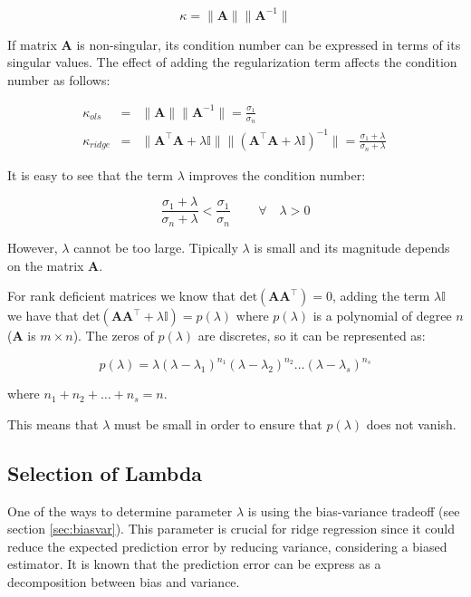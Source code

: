 \begin{equation*}
	\kappa = \|\mathbf{A}\| \|\mathbf{A}^{-1}\|
\end{equation*}

If matrix $\mathbf{A}$ is non-singular, its condition number can be
expressed in terms of its singular values. The effect of adding the
regularization term affects the condition number as follows:

\begin{eqnarray*}
\kappa_{ols} &=& \|\mathbf{A}\| \|\mathbf{A}^{-1}\|=\frac{\sigma_1}{\sigma_n} \\
\kappa_{ridge} &=& \|\mathbf{A}^\intercal \mathbf{A} + \lambda \mathbb{I}\| 
\|(\mathbf{A}^\intercal \mathbf{A} + \lambda \mathbb{I})^{-1}\|=\frac{\sigma_1+\lambda}{\sigma_n + \lambda} \,
\end{eqnarray*}

It is easy to see that the term $\lambda$ improves the condition number: 

\begin{equation*}
        \frac{\sigma_1+\lambda}{\sigma_n + \lambda} <
        \frac{\sigma_1}{\sigma_n} \,  \qquad \forall \quad \lambda > 0
\end{equation*}


However, $\lambda$ cannot be too large. Tipically $\lambda$ is small and its
magnitude depends on the matrix $\mathbf{A}$.

For rank deficient matrices we know that $\text{det}(\mathbf{A A^\top})=0$, adding the
term $\lambda \mathbb{I}$ we have that $\text{det}(\mathbf{A A^\top}+\lambda \mathbb{I}) =
p(\lambda)$ where $p(\lambda)$ is a polynomial of degree $n$ ($\mathbf{A}$ is
$m \times n$). The zeros of $p(\lambda)$ are discretes, so it can be represented
as:

\[
p(\lambda) =
\lambda(\lambda-\lambda_1)^{n_1}(\lambda-\lambda_2)^{n_2}\dots(\lambda-\lambda_s)^{n_s}
\]

\noindent where $n_1 + n_2 + \dots + n_s = n$.

This means that $\lambda$ must be small in order to ensure that $p(\lambda)$
does not vanish.


\subsection{Selection of Lambda}

One of the ways to determine parameter $\lambda$ is using the bias-variance tradeoff (see section \ref{sec:biasvar}). This parameter is crucial for ridge regression since it could
reduce the expected prediction error by reducing variance, considering a biased
estimator. 
It is known that the prediction error can be express as a decomposition between bias and variance.

